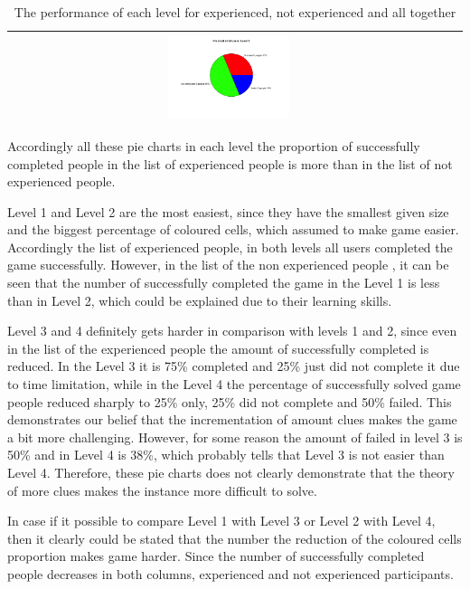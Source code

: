 \begin{table}
\begin{tabular}{ |c|c|c|c| }
    & \includegraphics[width= 0.3\textwidth]{img/L5_all.png}\\  
    \hline
\end{tabular}
\caption{The performance of each level for experienced, not experienced and all together}
\label{table:piecharts_all_levels}
\end{table}

Accordingly all these pie charts in each level the proportion of successfully completed people in the list of experienced people is more than in the list of not experienced people. 

Level 1 and Level 2 are the most easiest, since they have the smallest given size and the biggest percentage of coloured cells, which assumed to make game easier. Accordingly the list of experienced people, in both levels all users completed the game successfully. However, in the list of the non experienced people , it can be seen that the number of successfully completed the game in the Level 1 is less than in Level 2, which could be explained due to their learning skills.

Level 3 and 4 definitely gets harder in comparison with levels 1 and 2, since even in the list of the experienced people the amount of successfully completed is reduced. In the Level 3 it is 75\% completed and 25\% just did not complete it due to time limitation, while in the Level 4 the percentage of successfully solved game people reduced sharply to 25\% only, 25\% did not complete and 50\% failed. This demonstrates our belief that the incrementation of amount clues makes the game a bit more challenging. However, for some reason the amount of failed in level 3 is 50\% and in Level 4 is 38\%, which probably tells that Level 3 is not easier than Level 4. Therefore, these pie charts does not clearly demonstrate that the theory of more clues makes the instance more difficult to solve. 

In case if it possible to compare Level 1 with Level 3 or Level 2 with Level 4, then it clearly could be stated that the number the reduction of the coloured cells proportion makes game harder. Since the number of successfully completed people decreases in both columns, experienced and not experienced participants.

